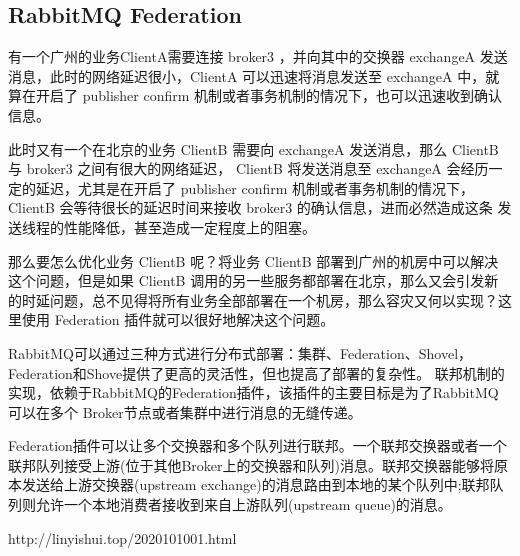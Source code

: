 \documentclass[../../../interview-questions.tex]{subfiles}
\begin{document}
\subsection{RabbitMQ Federation}

有一个广州的业务ClientA需要连接 broker3 ，并向其中的交换器 exchangeA 发送消息，此时的网络延迟很小，ClientA 可以迅速将消息发送至 exchangeA 中，就算在开启了 publisher confirm 机制或者事务机制的情况下，也可以迅速收到确认信息。

此时又有一个在北京的业务 ClientB 需要向 exchangeA 发送消息，那么 ClientB 与 broker3 之间有很大的网络延迟， ClientB 将发送消息至 exchangeA 会经历一定的延迟，尤其是在开启了 publisher confirm 机制或者事务机制的情况下， ClientB 会等待很长的延迟时间来接收 broker3 的确认信息，进而必然造成这条 发送线程的性能降低，甚至造成一定程度上的阻塞。

那么要怎么优化业务 ClientB 呢？将业务 ClientB 部署到广州的机房中可以解决这个问题，但是如果 ClientB 调用的另一些服务都部署在北京，那么又会引发新的时延问题，总不见得将所有业务全部部署在一个机房，那么容灾又何以实现？这里使用 Federation 插件就可以很好地解决这个问题。

RabbitMQ可以通过三种方式进行分布式部署：集群、Federation、Shovel，Federation和Shove提供了更高的灵活性，但也提高了部署的复杂性。
联邦机制的实现，依赖于RabbitMQ的Federation插件，该插件的主要目标是为了RabbitMQ可以在多个 Broker节点或者集群中进行消息的无缝传递。

Federation插件可以让多个交换器和多个队列进行联邦。一个联邦交换器或者一个联邦队列接受上游(位于其他Broker上的交换器和队列)消息。联邦交换器能够将原本发送给上游交换器(upstream exchange)的消息路由到本地的某个队列中;联邦队列则允许一个本地消费者接收到来自上游队列(upstream queue)的消息。

http://linyishui.top/2020101001.html
\end{document}
